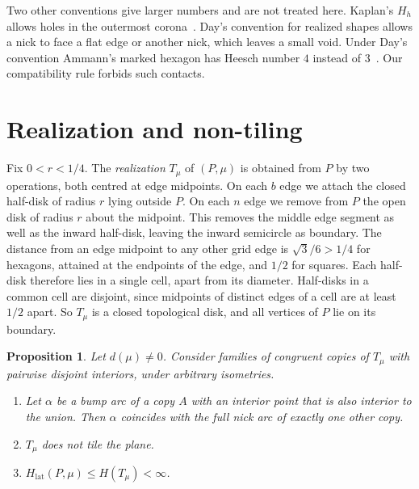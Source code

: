 \documentclass[11pt]{amsart}
\newtheorem{proposition}[theorem]{Proposition}
\theoremstyle{definition}
\theoremstyle{remark}
\newcommand{\Hl}{H_{\mathrm{lat}}}
\begin{document}
Two other conventions give larger numbers and are not treated here. Kaplan's $H_h$ allows holes in the outermost corona~\cite{Kaplan2022}. Day's convention for realized shapes allows a nick to face a flat edge or another nick, which leaves a small void. Under Day's convention Ammann's marked hexagon has Heesch number $4$ instead of $3$~\cite{EppsteinJunkyard}. Our compatibility rule forbids such contacts.

\section{Realization and non-tiling}

Fix $0<r<1/4$. The \emph{realization} $T_\mu$ of $(P,\mu)$ is obtained from $P$ by two operations, both centred at edge midpoints. On each $b$ edge we attach the closed half-disk of radius $r$ lying outside $P$. On each $n$ edge we remove from $P$ the open disk of radius $r$ about the midpoint. This removes the middle edge segment as well as the inward half-disk, leaving the inward semicircle as boundary. The distance from an edge midpoint to any other grid edge is $\sqrt3/6>1/4$ for hexagons, attained at the endpoints of the edge, and $1/2$ for squares. Each half-disk therefore lies in a single cell, apart from its diameter. Half-disks in a common cell are disjoint, since midpoints of distinct edges of a cell are at least $1/2$ apart. So $T_\mu$ is a closed topological disk, and all vertices of $P$ lie on its boundary.

\begin{proposition}\label{prop:realize}
Let $d(\mu)\ne0$. Consider families of congruent copies of $T_\mu$ with pairwise disjoint interiors, under arbitrary isometries.
\begin{enumerate}
\item Let $\alpha$ be a bump arc of a copy $A$ with an interior point that is also interior to the union. Then $\alpha$ coincides with the full nick arc of exactly one other copy.
\item $T_\mu$ does not tile the plane.
\item $\Hl(P,\mu)\le H(T_\mu)<\infty$.
\end{enumerate}
\end{proposition}
\end{document}
